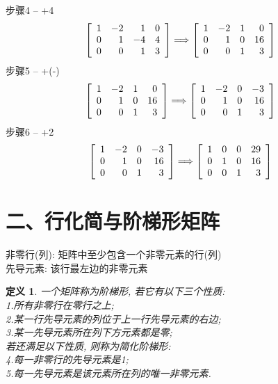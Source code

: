 \documentclass[UTF8,fontset=ubuntu]{ctexart}
\theoremstyle{plain}
\theoremstyle{nonumberplain}
\newtheorem{definition}{定义}
\theoremstyle{empty}
\begin{document}
步骤4 -- +4
\[\left[\begin{array}{r r r r}
    1 & -2 & 1 & 0\\
    0 & 1 & -4 & 4\\
    0 & 0 & 1 & 3
\end{array}\right] \Longrightarrow \left[\begin{array}{r r r r}
	1 & -2 & 1 & 0\\
	0 & 1 & 0 & 16\\
	0 & 0 & 1 & 3
\end{array}\right]\]
步骤5 -- +(-)
\[\left[\begin{array}{r r r r}
    1 & -2 & 1 & 0\\
    0 & 1 & 0 & 16\\
    0 & 0 & 1 & 3
\end{array}\right] \Longrightarrow \left[\begin{array}{r r r r}
	1 & -2 & 0 & -3\\
	0 & 1 & 0 & 16\\
	0 & 0 & 1 & 3
\end{array}\right]\]
步骤6 -- +2
\[\left[\begin{array}{r r r r}
    1 & -2 & 0 & -3\\
    0 & 1 & 0 & 16\\
    0 & 0 & 1 & 3
\end{array}\right] \Longrightarrow \left[\begin{array}{r r r r}
	1 & 0 & 0 & 29\\
	0 & 1 & 0 & 16\\
	0 & 0 & 1 & 3
\end{array}\right]\]
\vspace{6ex}

\section{二、行化简与阶梯形矩阵}
非零行(列): 矩阵中至少包含一个非零元素的行(列)\\
先导元素: 该行最左边的非零元素\\
\begin{definition}
一个矩阵称为阶梯形, 若它有以下三个性质:\\
1.所有非零行在零行之上;\\
2.某一行先导元素的列位于上一行先导元素的右边;\\
3.某一先导元素所在列下方元素都是零;\\
若还满足以下性质, 则称为简化阶梯形:\\
4.每一非零行的先导元素是1;\\
5.每一先导元素是该元素所在列的唯一非零元素.
\end{definition}\vspace{2ex}
\end{document}
